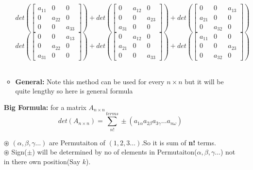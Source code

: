 \documentclass[a4paper,11pt]{article}
\numberwithin{equation}{section}
\begin{document}
\begin{itemize}
\begin{itemize}
\begin{center}
    \[
        det\left(\begin{bmatrix}
        a_{11}&0&0\\0&a_{22}&0\\0&0&a_{33}
    \end{bmatrix}\right)+
        det\left(\begin{bmatrix}
           0&a_{12}&0\\0&0&a_{23}\\a_{31}&0&0
        \end{bmatrix}\right)+
        det\left(\begin{bmatrix}
            0&0&a_{13}\\a_{21}&0&0\\0&a_{32}&0
        \end{bmatrix}\right)
    \]
    \[
        det\left(\begin{bmatrix}
            0&0&a_{13}\\0&a_{22}&0\\a_{31}&0&0
        \end{bmatrix}\right)+
        det\left(\begin{bmatrix}
            0&a_{12}&0\\a_{21}&0&0\\0&0&a_{33}
        \end{bmatrix}\right)+
        det\left(\begin{bmatrix}
            a_{11}&0&0\\0&0&a_{23}\\0&a_{32}&0
        \end{bmatrix}\right)
    \]\\
\end{center}

\item \textbf{General: }Note this method can be used for every $n\times n$ but it will be quite lengthy so here is general formula

\end{itemize}

\textbf{Big Formula: }for  a matrix $A_{n\times n}$
\begin{equation}
    det(A_{n\times n})=\sum_{n!}^{terms} \pm \left(a_{1\alpha}a_{2\beta}a_{3\gamma}\dots a_{n\omega}\right)
\end{equation}

$\circledast$ $(\alpha,\beta,\gamma\dots) $ are Permutaiton of $(1,2,3\dots)$.So it is sum of \textbf{n!} terms.\\
$\circledast$ Sign($\pm$) will be determined by no of elements in Permutaiton($\alpha,\beta,\gamma\dots$) not in there own position(Say $k$).\\


\end{itemize}
\end{document}
